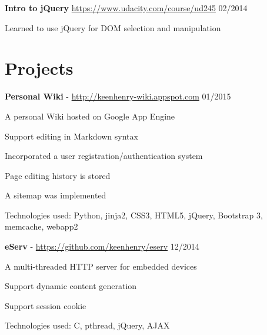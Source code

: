 \documentclass[margin,line]{resume}
\begin{document}
\begin{resume}
    \textbf{Intro to jQuery} \url{https://www.udacity.com/course/ud245} \hfill 02/2014 \vspace{-3mm}\\\vspace{-1mm}%
      \begin{list2}
       \item Learned to use jQuery for DOM selection and manipulation
      \end{list2}
    \vspace{-2mm}

    \section{\myheadingstyle Projects}

    \textbf{Personal Wiki} - \url{http://keenhenry-wiki.appspot.com} \hfill 01/2015 \vspace{-3mm}\\\vspace{-1mm}%
      \begin{list2}
       \item A personal Wiki hosted on Google App Engine
       \item Support editing in Markdown syntax
       \item Incorporated a user registration/authentication system
       \item Page editing history is stored
       \item A sitemap was implemented
       \item Technologies used: Python, jinja2, CSS3, HTML5, jQuery, Bootstrap 3, memcache, webapp2
      \end{list2}

    \textbf{eServ} - \url{https://github.com/keenhenry/eserv} \hfill 12/2014 \vspace{-3mm}\\\vspace{-1mm}%
      \begin{list2}
       \item A multi-threaded HTTP server for embedded devices
       \item Support dynamic content generation
       \item Support session cookie
       \item Technologies used: C, pthread, jQuery, AJAX
      \end{list2}


\end{resume}
\end{document}
